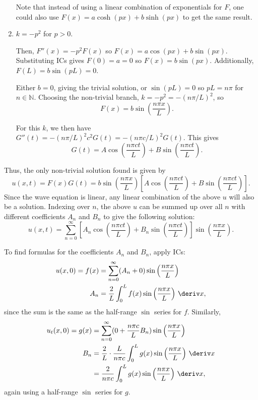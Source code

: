 \documentclass[10pt, a4paper]{article}
\begin{document}
\begin{landscape}
\begin{multicols*}{2}
\begin{enumerate}
            Note that instead of using a linear combination of exponentials for \(F\), one could also use
            \(F(x) = a \cosh(px) + b \sinh(px)\) to get the same result.

        \item \(k = -p^2\) for \(p > 0\).
        
            Then, \(F''(x) = -p^2 F(x)\) so \(F(x) = a \cos(px) + b \sin(px)\).
            Substituting ICs gives
            \(F(0) = a = 0\) so \(F(x) = b \sin(px)\). Additionally,
            \(F(L) = b \sin(pL) = 0\).

            Either \(b = 0\), giving the trivial solution, or \(\sin(pL) = 0\) so \(pL = n \pi\) for
            \(n \in \mathbb{N}\). Choosing the non-trivial branch,
            \(k = -p^2 = -(n \pi / L)^2\), so
            \[
                F(x) = b \sin \left(\frac{n \pi x}{L}\right).
            \]

            For this \(k\), we then have
            \(G''(t) = -(n \pi / L)^2 c^2 G(t) = -(n \pi c / L)^2 G(t)\).
            This gives
            \[
                G(t) = A \cos\left(\frac{n \pi ct}{L}\right) + B \sin \left(\frac{n \pi ct}{L}\right).
            \]
    \end{enumerate}

    Thus, the only non-trivial solution found is given by
    \[
        u(x, t)
        = F(x) G(t)
        = b \sin \left(\frac{n \pi x}{L}\right)
        \left[
            A \cos\left(\frac{n \pi ct}{L}\right) + B \sin \left(\frac{n \pi ct}{L}\right)
        \right].
    \]
    Since the wave equation is linear, any linear combination of the above \(u\) will also
    be a solution. Indexing over \(n\), the above \(u\) can be summed up over all \(n\) with
    different coefficients \(A_n\) and \(B_n\) to give the following solution:
    \[
        u(x, t)
        = \sum_{n=0}^{\infty} \left[
            A_n \cos\left(\frac{n \pi ct}{L}\right) + B_n \sin \left(\frac{n \pi ct}{L}\right)
        \right]
        \sin \left(\frac{n \pi x}{L}\right).
    \]

    To find formulas for the coefficients \(A_n\) and \(B_n\), apply ICs:
    \begin{align*}
        u(x, 0) = f(x) &= \sum_{n=0}^{\infty} (A_n + 0) \sin\left(\frac{n \pi x}{L}\right) \\
        A_n &= \frac{2}{L} \int_0^L f(x) \sin\left(\frac{n \pi x}{L}\right) \,\deriv x,
    \end{align*}
    since the sum is the same as the half-range \(\sin\) series for \(f\). Similarly,
    \begin{align*}
        u_t(x, 0) = g(x) &= \sum_{n=0}^{\infty} (0 + \frac{n \pi c}{L} B_n) \sin \left(\frac{n \pi x}{L}\right) \\
        B_n &= \frac{2}{L} \cdot \frac{L}{n \pi c} \int_{0}^L g(x) \sin \left(\frac{n \pi x}{L}\right) \,\deriv x \\
        &= \frac{2}{n \pi c} \int_{0}^L g(x) \sin \left(\frac{n \pi x}{L}\right) \,\deriv x,
    \end{align*}
    again using a half-range \(\sin\) series for \(g\).


\end{multicols*}
\end{landscape}
\end{document}

